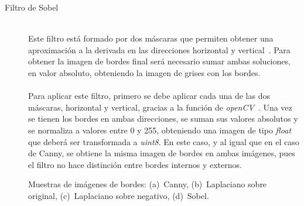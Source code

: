 \begin{description}
	\vspace{5pt}
	\item[Filtro de Sobel] \hfill 
	\vspace{5pt}
	\\
	Este filtro está formado por dos máscaras que permiten obtener una aproximación a la derivada en las direcciones horizontal y vertical~\cite{gonzalez2008digital}. Para obtener la imagen de bordes final será necesario sumar ambas soluciones, en valor absoluto, obteniendo la imagen de grises con los bordes.\\
	\vspace{-10pt}
	\\
	Para aplicar este filtro, primero se debe aplicar cada una de las dos máscaras, horizontal y vertical, gracias a la función de \textit{openCV}~\cite{sobelOCV}. Una vez se tienen los bordes en ambas direcciones, se suman sus valores absolutos y se normaliza a valores entre 0 y 255, obteniendo una imagen de tipo \textit{float} que deberá ser transformada a \textit{uint8}. En este caso, y al igual que en el caso de Canny, se obtiene la misma imagen de bordes en ambas imágenes, pues el filtro no hace distinción entre bordes internos y externos.	
\end{description}

\begin{figure}[H]
	\centering
	 \hspace{10pt}
	 \hspace{10pt}
	 \hspace{10pt}
	\caption{Muestras de imágenes de bordes: (a)~Canny, (b)~Laplaciano sobre original, (c)~Laplaciano sobre negativo, (d)~Sobel.}
	\label{fig.bordes}
\end{figure}

